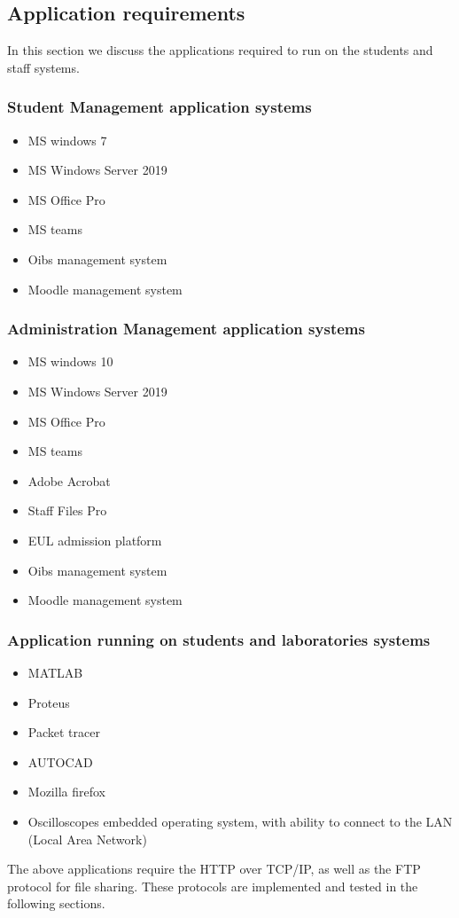 \documentclass[ a4, 12pt, onecolumn]{IEEEtran}
\begin{document}
\subsection{Application requirements}
In this section we discuss the applications required to run on the students and staff systems.
\subsubsection{Student Management application systems}
\begin{itemize}
\item MS windows 7
\item MS Windows Server 2019
\item MS Office Pro
\item MS teams
\item Oibs management system
\item Moodle management system
\end{itemize}
\subsubsection{Administration Management application systems}
\begin{itemize}
\item MS windows 10
\item MS Windows Server 2019
\item MS Office Pro
\item MS teams
\item  Adobe Acrobat
\item Staff Files Pro
\item EUL admission platform
\item Oibs management system
\item Moodle management system
\end{itemize}
\subsubsection{Application running on students and laboratories systems}
\begin{itemize}
\item MATLAB
\item Proteus
\item Packet tracer
\item AUTOCAD
\item Mozilla firefox
\item Oscilloscopes embedded operating system, with ability to connect to the LAN (Local Area Network)

\end{itemize}
The above applications require the HTTP over TCP/IP, as well as the FTP protocol for file sharing. These protocols are implemented and tested in the following sections. 
\end{document}
